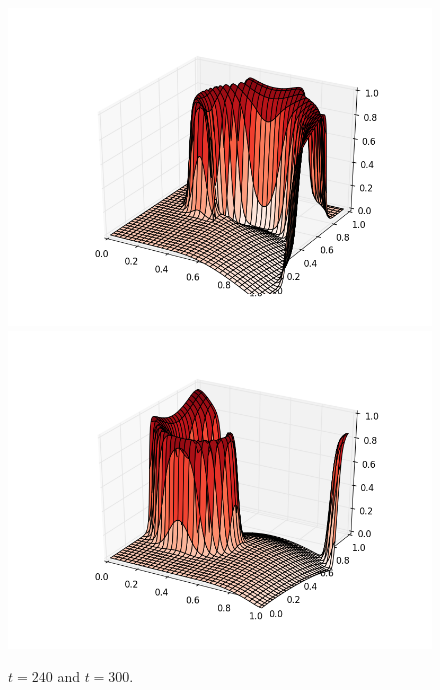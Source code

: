 \documentclass[12pt]{article}
\begin{document}
\begin{figure}[H]
\includegraphics[scale=0.4]{partc_fig_frames/partc_fig09.png}%
\includegraphics[scale=0.4]{partc_fig_frames/partc_fig11.png}
\caption{$t=240$ and $t=300$.}
\end{figure}
\end{document}
